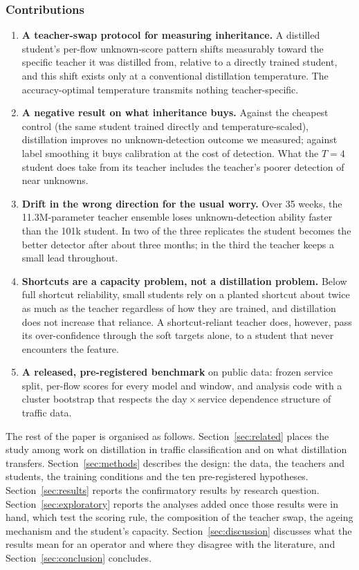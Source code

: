 \documentclass[journal]{IEEEtran}
\begin{document}
\subsubsection*{Contributions}
\begin{enumerate}
\item \textbf{A teacher-swap protocol for measuring inheritance.} A distilled student's per-flow unknown-score pattern shifts measurably toward the specific teacher it was distilled from, relative to a directly trained student, and this shift exists only at a conventional distillation temperature. The accuracy-optimal temperature transmits nothing teacher-specific.
\item \textbf{A negative result on what inheritance buys.} Against the cheapest control (the same student trained directly and temperature-scaled), distillation improves no unknown-detection outcome we measured; against label smoothing it buys calibration at the cost of detection. What the $T=4$ student does take from its teacher includes the teacher's poorer detection of near unknowns.
\item \textbf{Drift in the wrong direction for the usual worry.} Over 35 weeks, the 11.3M-parameter teacher ensemble loses unknown-detection ability faster than the 101k student. In two of the three replicates the student becomes the better detector after about three months; in the third the teacher keeps a small lead throughout.
\item \textbf{Shortcuts are a capacity problem, not a distillation problem.} Below full shortcut reliability, small students rely on a planted shortcut about twice as much as the teacher regardless of how they are trained, and distillation does not increase that reliance. A shortcut-reliant teacher does, however, pass its over-confidence through the soft targets alone, to a student that never encounters the feature.
\item \textbf{A released, pre-registered benchmark} on public data: frozen service split, per-flow scores for every model and window, and analysis code with a cluster bootstrap that respects the day\,$\times$\,service dependence structure of traffic data.
\end{enumerate}

The rest of the paper is organised as follows. Section~\ref{sec:related} places the study among work on distillation in traffic classification and on what distillation transfers. Section~\ref{sec:methods} describes the design: the data, the teachers and students, the training conditions and the ten pre-registered hypotheses. Section~\ref{sec:results} reports the confirmatory results by research question. Section~\ref{sec:exploratory} reports the analyses added once those results were in hand, which test the scoring rule, the composition of the teacher swap, the ageing mechanism and the student's capacity. Section~\ref{sec:discussion} discusses what the results mean for an operator and where they disagree with the literature, and Section~\ref{sec:conclusion} concludes.
\end{document}
